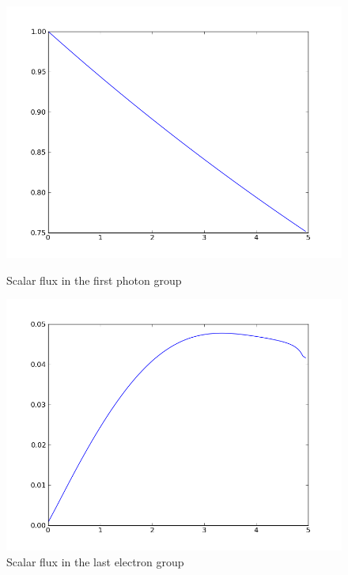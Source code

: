 \begin{figure}[H]
\begin{minipage}[b]{0.42\linewidth}
\centering
\includegraphics[width=\linewidth]{./images/al/group_0_moment_0}
\caption{Scalar flux in the first photon group}
\end{minipage}
\hspace{0.5cm}
\begin{minipage}[b]{0.42\linewidth}
\centering
\includegraphics[width=\linewidth]{./images/al/group_39_moment_0}
\caption{Scalar flux in the last electron group}
\end{minipage}
\end{figure}

